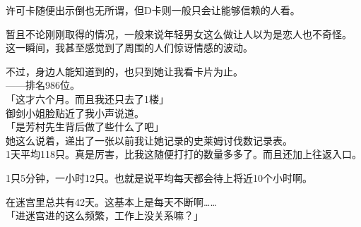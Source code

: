 许可卡随便出示倒也无所谓，但D卡则一般只会让能够信赖的人看。

暂且不论刚刚取得的情况，一般来说年轻男女这么做让人以为是恋人也不奇怪。\\

这一瞬间，我甚至感觉到了周围的人们惊讶情感的波动。

不过，身边人能知道到的，也只到她让我看卡片为止。\\

——排名986位。\\

「这才六个月。而且我还只去了1楼」\\

御剑小姐脸贴近了我小声说道。\\

「是芳村先生背后做了些什么了吧」\\

她这么说着，递出了一张以前我让她记录的史莱姆讨伐数记录表。\\

1天平均118只。真是厉害，比我这随便打打的数量多多了。而且还加上往返入口。

1只5分钟，一小时12只。也就是说平均每天都会待上将近10个小时啊。

在迷宫里总共有42天。这基本上是每天不断啊……\\

「进迷宫进的这么频繁，工作上没关系嘛？」

